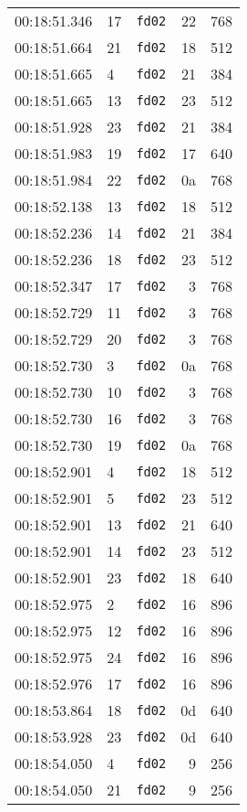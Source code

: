 \documentclass{article}
\begin{document}
\begin{longtable}{lllrr}
00:18:51.346 & 17 & \texttt{fd02} & 22 & 768 \\
00:18:51.664 & 21 & \texttt{fd02} & 18 & 512 \\
00:18:51.665 & 4 & \texttt{fd02} & 21 & 384 \\
00:18:51.665 & 13 & \texttt{fd02} & 23 & 512 \\
00:18:51.928 & 23 & \texttt{fd02} & 21 & 384 \\
00:18:51.983 & 19 & \texttt{fd02} & 17 & 640 \\
00:18:51.984 & 22 & \texttt{fd02} & 0a & 768 \\
00:18:52.138 & 13 & \texttt{fd02} & 18 & 512 \\
00:18:52.236 & 14 & \texttt{fd02} & 21 & 384 \\
00:18:52.236 & 18 & \texttt{fd02} & 23 & 512 \\
00:18:52.347 & 17 & \texttt{fd02} & 3 & 768 \\
00:18:52.729 & 11 & \texttt{fd02} & 3 & 768 \\
00:18:52.729 & 20 & \texttt{fd02} & 3 & 768 \\
00:18:52.730 & 3 & \texttt{fd02} & 0a & 768 \\
00:18:52.730 & 10 & \texttt{fd02} & 3 & 768 \\
00:18:52.730 & 16 & \texttt{fd02} & 3 & 768 \\
00:18:52.730 & 19 & \texttt{fd02} & 0a & 768 \\
00:18:52.901 & 4 & \texttt{fd02} & 18 & 512 \\
00:18:52.901 & 5 & \texttt{fd02} & 23 & 512 \\
00:18:52.901 & 13 & \texttt{fd02} & 21 & 640 \\
00:18:52.901 & 14 & \texttt{fd02} & 23 & 512 \\
00:18:52.901 & 23 & \texttt{fd02} & 18 & 640 \\
00:18:52.975 & 2 & \texttt{fd02} & 16 & 896 \\
00:18:52.975 & 12 & \texttt{fd02} & 16 & 896 \\
00:18:52.975 & 24 & \texttt{fd02} & 16 & 896 \\
00:18:52.976 & 17 & \texttt{fd02} & 16 & 896 \\
00:18:53.864 & 18 & \texttt{fd02} & 0d & 640 \\
00:18:53.928 & 23 & \texttt{fd02} & 0d & 640 \\
00:18:54.050 & 4 & \texttt{fd02} & 9 & 256 \\
00:18:54.050 & 21 & \texttt{fd02} & 9 & 256 \\

\end{longtable}
\end{document}
